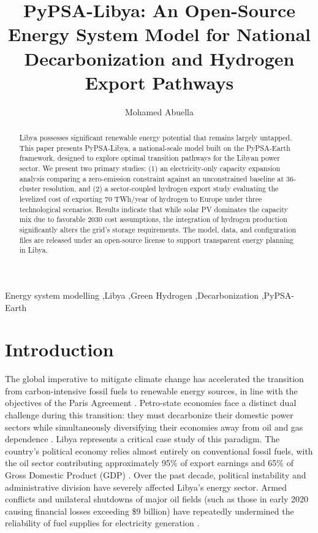 \documentclass[preprint,12pt]{elsarticle}
\begin{document}
\begin{frontmatter}

\title{PyPSA-Libya: An Open-Source Energy System Model for National Decarbonization and Hydrogen Export Pathways}

\author[a]{Mohamed Abuella}


\begin{abstract}
Libya possesses significant renewable energy potential that remains largely untapped. This paper presents PyPSA-Libya, a national-scale model built on the PyPSA-Earth framework, designed to explore optimal transition pathways for the Libyan power sector. We present two primary studies: (1) an electricity-only capacity expansion analysis comparing a zero-emission constraint against an unconstrained baseline at 36-cluster resolution, and (2) a sector-coupled hydrogen export study evaluating the levelized cost of exporting 70 TWh/year of hydrogen to Europe under three technological scenarios. Results indicate that while solar PV dominates the capacity mix due to favorable 2030 cost assumptions, the integration of hydrogen production significantly alters the grid's storage requirements. The model, data, and configuration files are released under an open-source license to support transparent energy planning in Libya.
\end{abstract}

\begin{keyword}
Energy system modelling \sep Libya \sep Green Hydrogen \sep Decarbonization \sep PyPSA-Earth
\end{keyword}

\end{frontmatter}


\section{Introduction}
\label{sec:introduction}

The global imperative to mitigate climate change has accelerated the transition from carbon-intensive fossil fuels to renewable energy sources, in line with the objectives of the Paris Agreement \cite{almaktar2021prospects, alanazi2025renewable}. Petro-state economies face a distinct dual challenge during this transition: they must decarbonize their domestic power sectors while simultaneously diversifying their economies away from oil and gas dependence \cite{almaktar2021prospects, eljrushi1990solar}. Libya represents a critical case study of this paradigm. The country's political economy relies almost entirely on conventional fossil fuels, with the oil sector contributing approximately 95\% of export earnings and 65\% of Gross Domestic Product (GDP) \cite{almaktar2021prospects}. Over the past decade, political instability and administrative division have severely affected Libya's energy sector. Armed conflicts and unilateral shutdowns of major oil fields (such as those in early 2020 causing financial losses exceeding \$9 billion) have repeatedly undermined the reliability of fuel supplies for electricity generation \cite{almaktar2021prospects}.
\end{document}
